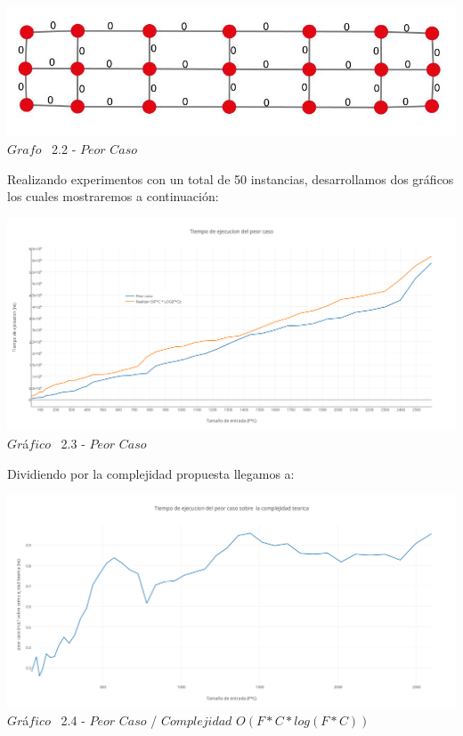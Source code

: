 \vspace*{0.3cm} \vspace*{0.3cm}
  \begin{center}
 \includegraphics[scale=0.5]{./EJ2/ej2grafosinpared.jpeg}
 \\{$Grafo$ \ 2.2 - $Peor$ $Caso$}
  \end{center}
  \vspace*{0.3cm}
  
Realizando experimentos con un total de 50 instancias, desarrollamos dos gr\'aficos los cuales mostraremos a continuaci\'on: \\

\vspace*{0.3cm} \vspace*{0.3cm}
  \begin{center}
 \includegraphics[scale=0.50]{./EJ2/peorcaso.png}
 {$Gr$\'a$fico$ \ 2.3 - $Peor$ $Caso$}
  \end{center}
  \vspace*{0.3cm}


Dividiendo por la complejidad propuesta llegamos a:\\

\vspace*{0.3cm} \vspace*{0.3cm}
  \begin{center}
 \includegraphics[scale=0.50]{./EJ2/peorcaso1.png}
 {$Gr$\'a$fico$ \ 2.4 - $Peor$ $Caso$ / $Complejidad$ $O(F*C* log(F*C))$}
  \end{center}
  \vspace*{0.3cm}

